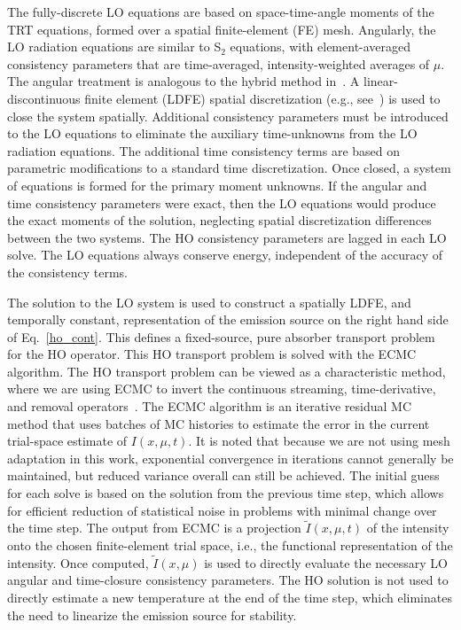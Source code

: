 \documentclass{anstrans}
\begin{document}
The fully-discrete LO equations are based on space-time-angle moments of the TRT equations, formed
over a spatial finite-element (FE) mesh.  Angularly, the LO radiation equations are similar to S$_2$
equations,  with element-averaged consistency parameters that are time-averaged, intensity-weighted averages of $\mu$.  The
angular treatment is analogous to the hybrid method in~\cite{wolters}. A linear-discontinuous finite
element (LDFE) spatial discretization (e.g., see~\cite{morel_ldtrt}) is used to close the system
spatially. Additional consistency parameters must be introduced to the LO equations to eliminate the
auxiliary time-unknowns from the LO radiation equations.  The additional time consistency terms are
based on parametric modifications to a standard time discretization.  Once closed, a system of
equations is formed for the primary moment unknowns. If the angular and time consistency parameters
were exact, then the LO equations would produce the exact moments of the solution, neglecting
spatial discretization differences between the two systems.  The HO consistency parameters are
lagged in each LO solve. The LO equations always conserve energy, independent of the accuracy of the consistency terms.

The solution to the LO system is used to construct a spatially LDFE, and temporally constant,
representation of the emission source on the right hand side of Eq.~\eqref{ho_cont}.  This defines a
fixed-source, pure absorber transport problem for the HO operator.  This HO transport problem is
solved with the ECMC algorithm. The HO transport problem can be viewed as a characteristic
method, where we are using ECMC to invert the continuous streaming, time-derivative, and removal
operators~\cite{bolding_nse}. The ECMC
algorithm is an iterative residual MC method that uses
batches of MC histories to estimate the error in the current trial-space estimate of 
$I(x,\mu,t)$.  It is noted that because we are not using
mesh adaptation in this work, exponential convergence in iterations cannot generally be maintained,
but reduced variance overall can still be achieved. The initial guess for each solve is based on the
solution from the previous time step, which allows for efficient reduction of statistical noise in
problems with minimal change over the time step. The output from ECMC is a projection $\tilde I(x,\mu,t)$ of the intensity onto
the chosen finite-element trial space, i.e., the functional representation of the intensity. Once
computed, $\tilde{I}(x,\mu)$ is used to directly evaluate the necessary LO angular and time-closure
consistency parameters.   The HO solution is not used to directly estimate a new temperature at the
end of the time step, which eliminates the need to linearize the emission source for stability.
\end{document}
